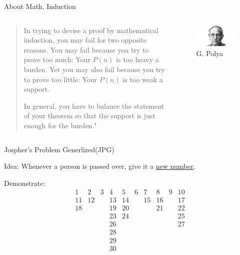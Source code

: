 \begin{frame}{About Math. Induction}
\begin{columns}
\begin{column}{0.6\textwidth}
\begin{quote}
    In trying to devise a proof by mathematical induction, you may fail for two opposite reasons. You may fail because you try to prove too much: Your $P(n)$ is too heavy a burden. Yet you may also fail because you try to prove too little: Your $P(n)$ is too weak a support.
    
    In general, you have to balance the statement of your theorem so that the support is just enough for the burden."
\end{quote}
\end{column}

\begin{column}{0.4\textwidth}
\begin{figure}
    \centering
    \includegraphics[width=\textwidth]{fig/ch3/gpolya.jpeg}
    \caption{G. Polya}
    \label{fig:induction}
\end{figure}
\end{column}

\end{columns}
    
\end{frame}

\begin{frame}{Jospher's Problem Generlized(JPG)}

Idea: Whenever a person is passed over, give it a \underline{new
number}. 

Demonstrate: \pause 
$$
\begin{array}{rrrrrrrrrr}1&2&3&4&5&6&7&8&9&10\\11&12&&13&14&&15&16&&17\\18&&&19&20&&&21&&22\\&&&23&24&&&&&25\\&&&26&&&&&&27\\&&&28&&&&&\\&&&29&&&&\\&&&30&&&&&\end{array}
$$
    
\end{frame}

